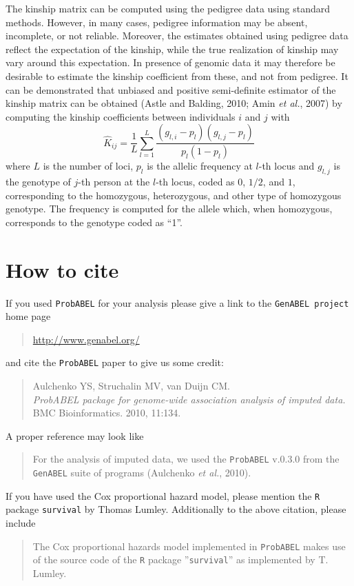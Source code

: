 \documentclass[12pt,a4paper]{article}
\newcommand{\PA}{\texttt{ProbABEL}}
\begin{document}
The kinship matrix can be computed using the pedigree data using standard methods.
However, in many cases, pedigree information may be absent, incomplete, or not
reliable. Moreover, the estimates obtained using pedigree data reflect the
expectation of the kinship, while the true realization of kinship may vary
around this expectation. In presence of genomic data it may therefore be
desirable to estimate the kinship coefficient from these, and not from pedigree.
It can be demonstrated that unbiased and positive semi-definite estimator
of the kinship matrix can be obtained (Astle and Balding, 2010; Amin \emph{et al.}, 2007)
by computing the kinship coefficients between individuals $i$ and $j$ with
$$
\hat{K}_{ij} = \frac{1}{L} \sum_{l=1}^L \frac{ (g_{l,i} - p_l) (g_{l,j} - p_l) }{ p_l (1-p_l) }
$$
where $L$ is the number of loci, $p_l$ is the allelic frequency at $l$-th locus
and $g_{l,j}$ is the genotype of $j$-th person at the $l$-th locus, coded
as $0$, $1/2$, and $1$, corresponding to the homozygous, heterozygous, and
other type of homozygous genotype. The frequency is computed for the allele
which, when homozygous, corresponds to the genotype coded as ``1''.


\section{How to cite}

If you used \PA{} for your analysis please give a link to the
\texttt{GenABEL project} home page
\begin{quote}
\url{http://www.genabel.org/}
\end{quote}
and cite the \PA{} paper to give us some credit:
\begin{quote}
Aulchenko YS, Struchalin MV, van Duijn CM.\\
\emph{ProbABEL package for genome-wide association analysis of imputed data.}\\
BMC Bioinformatics. 2010, 11:134.
\end{quote}
A proper reference may look like
\begin{quote}
For the analysis of imputed data, we used the \PA{} v.0.3.0
from the \texttt{GenABEL} suite of programs (Aulchenko \emph{et al.}, 2010).
\end{quote}

If you have used the Cox proportional hazard model, please mention the
\texttt{R} package \texttt{survival} by Thomas Lumley. Additionally
to the above citation, please include
\begin{quote}
The Cox proportional hazards model implemented in \PA{}
makes use of the source code of the \texttt{R} package ''\texttt{survival}''
as implemented by T. Lumley.
\end{quote}
\end{document}
